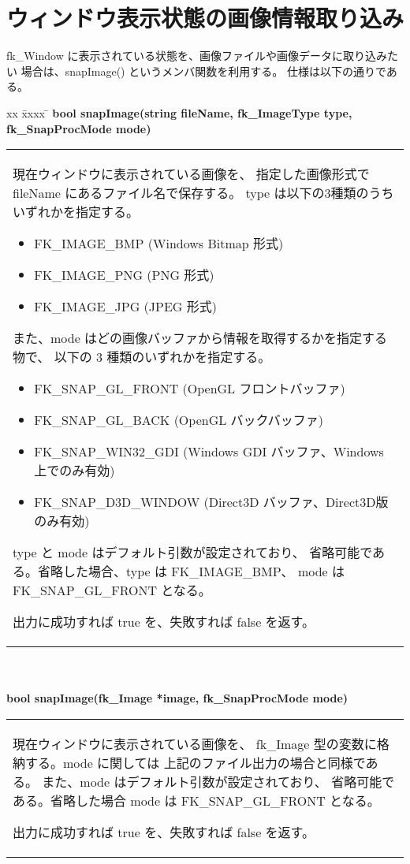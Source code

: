 \section{ウィンドウ表示状態の画像情報取り込み}
fk\_Window に表示されている状態を、画像ファイルや画像データに取り込みたい
場合は、snapImage() というメンバ関数を利用する。
仕様は以下の通りである。
\begin{tabbing}
xx \= xxxx \= \kill
\> \textbf{bool snapImage(string fileName,
	fk\_ImageType type, fk\_SnapProcMode mode)} \\
	\> \> \begin{tabular}{p{15cm}}
		現在ウィンドウに表示されている画像を、
		指定した画像形式で fileName にあるファイル名で保存する。
		type は以下の3種類のうちいずれかを指定する。
		\begin{itemize}
		 \item FK\_IMAGE\_BMP (Windows Bitmap 形式)
		 \item FK\_IMAGE\_PNG (PNG 形式)
		 \item FK\_IMAGE\_JPG (JPEG 形式)
		\end{itemize}
		また、mode はどの画像バッファから情報を取得するかを指定する物で、
		以下の 3 種類のいずれかを指定する。
		\begin{itemize}
		 \item FK\_SNAP\_GL\_FRONT (OpenGL フロントバッファ)
		 \item FK\_SNAP\_GL\_BACK (OpenGL バックバッファ)
		 \item FK\_SNAP\_WIN32\_GDI
		 (Windows GDI バッファ、Windows 上でのみ有効)
		 \item FK\_SNAP\_D3D\_WINDOW
		(Direct3D バッファ、Direct3D版のみ有効)
		\end{itemize}

		type と mode はデフォルト引数が設定されており、
		省略可能である。省略した場合、type は FK\_IMAGE\_BMP、
		mode は FK\_SNAP\_GL\_FRONT となる。

		出力に成功すれば true を、失敗すれば false を返す。

	\end{tabular} \\ \\
\> \textbf{bool snapImage(fk\_Image *image, fk\_SnapProcMode mode)} \\
	\> \> \begin{tabular}{p{15cm}}
		現在ウィンドウに表示されている画像を、
		fk\_Image 型の変数に格納する。mode に関しては
		上記のファイル出力の場合と同様である。
		また、mode はデフォルト引数が設定されており、
		省略可能である。省略した場合 mode は FK\_SNAP\_GL\_FRONT となる。

		出力に成功すれば true を、失敗すれば false を返す。
	\end{tabular} \\ \\
\end{tabbing}

